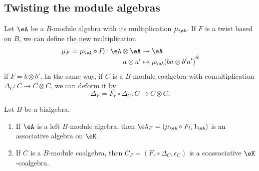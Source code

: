 \subsection{Twisting the module algebras}

Let $\eA$ be a $B$-module algebra with its multiplication $\mu_{\eA}$. If $F$ is a twist based on $B$, we can define the new multiplication
\begin{equation}
	\begin{aligned}
		\mu_F=\mu_{\eA}\circ F_l\colon \eA\otimes\eA&\to \eA \\
		a\otimes a'&\mapsto \mu_{\eA}(ba\otimes b'a') 
	\end{aligned}
a\end{equation}
if $F=b\otimes b'$. In the same way, if $C$ is a $B$-module coalgebra with comultiplication $\Delta_C\colon C\to C\otimes C$, we can deform it by
\begin{equation}
	\Delta_F=F_r\circ\Delta_C\colon C\to C\otimes C.
\end{equation}

\begin{theorem}		\label{ThoTwistAlgEtCoalg}
	Let $B$ be a bialgebra.
	\begin{enumerate}

		\item
			If $\eA$ is a left $B$-module algebra, then $\eA_F=(\mu_{\eA}\circ F_l,1_{\eA})$ is an associative algebra on $\eK$.
		\item
			If $C$ is a $B$-module coalgebra, then $C_F=(F_r\circ\Delta_C,\epsilon_C)$ is a coassociative $\eK$-coalgebra.

	\end{enumerate}
\end{theorem}

